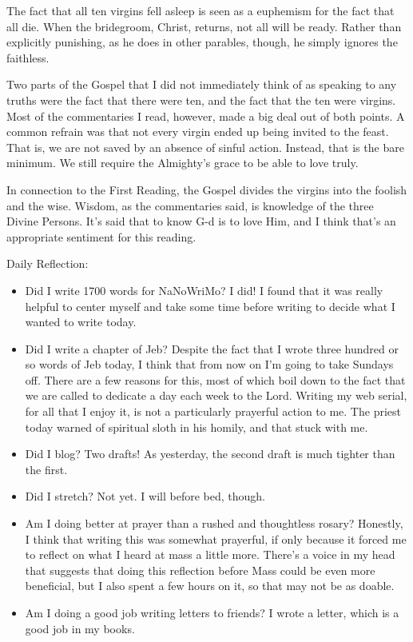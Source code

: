 \documentclass[12pt]{article}[titlepage]
\newcommand{\1}{\={a}}
\newcommand{\2}{\={e}}
\newcommand{\3}{\={\i}}
\newcommand{\4}{\=o}
\newcommand{\5}{\=u}
\newcommand{\6}{\={A}}
\renewcommand{\,}{\textsuperscript{,}}
\begin{document}
The fact that all ten virgins fell asleep is seen as a euphemism for the fact that all die.
When the bridegroom, Christ, returns, not all will be ready.
Rather than explicitly punishing, as he does in other parables, though, he simply ignores the faithless.

Two parts of the Gospel that I did not immediately think of as speaking to any truths were the fact that there were ten, and the fact that the ten were virgins.
Most of the commentaries I read, however, made a big deal out of both points.
A common refrain was that not every virgin ended up being invited to the feast.
That is, we are not saved by an absence of sinful action.
Instead, that is the bare minimum.
We still require the Almighty's grace to be able to love truly.

In connection to the First Reading, the Gospel divides the virgins into the foolish and the wise.
Wisdom, as the commentaries said, is knowledge of the three Divine Persons.
It's said that to know G-d is to love Him, and I think that's an appropriate sentiment for this reading.

Daily Reflection:
\begin{itemize}
\item Did I write 1700 words for NaNoWriMo?
I did! I found that it was really helpful to center myself and take some time before writing to decide what I wanted to write today.
\item Did I write a chapter of Jeb?
Despite the fact that I wrote three hundred or so words of Jeb today, I think that from now on I'm going to take Sundays off.
There are a few reasons for this, most of which boil down to the fact that we are called to dedicate a day each week to the Lord.
Writing my web serial, for all that I enjoy it, is not a particularly prayerful action to me.
The priest today warned of spiritual sloth in his homily, and that stuck with me.
\item Did I blog? Two drafts! As yesterday, the second draft is much tighter than the first.
\item Did I stretch? Not yet. I will before bed, though.
\item Am I doing better at prayer than a rushed and thoughtless rosary? Honestly, I think that writing this was somewhat prayerful, if only because it forced me to reflect on what I heard at mass a little more.
There's a voice in my head that suggests that doing this reflection before Mass could be even more beneficial, but I also spent a few hours on it, so that may not be as doable.
\item Am I doing a good job writing letters to friends?
I wrote a letter, which is a good job in my books.
\end{itemize}
\end{document}
